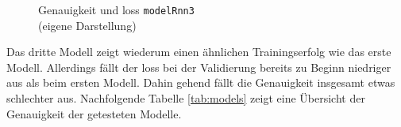 \documentclass[
    12pt, %
    DIV10,
    ngerman, %
    a4paper, %
    oneside, %
    titlepage, %
    parskip=half, %
    headings=normal, %
    listof=totoc, %
    bibliography=totoc, %
    index=totoc, %
    captions=tableheading, %
    final %
]{scrreprt}
\begin{document}
\begin{figure}[H]
\caption{Genauigkeit und loss \texttt{modelRnn3}\\(eigene Darstellung)}\label{fig:rnn3}
\end{figure}
Das dritte Modell zeigt wiederum einen ähnlichen Trainingserfolg wie das erste Modell. Allerdings fällt der loss bei der Validierung bereits zu Beginn niedriger aus als beim ersten Modell. Dahin gehend fällt die Genauigkeit insgesamt etwas schlechter aus. Nachfolgende Tabelle \ref{tab:models} zeigt eine Übersicht der  Genauigkeit der getesteten Modelle.
\end{document}
